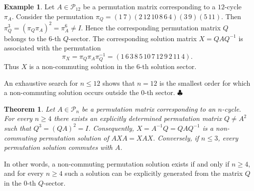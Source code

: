 \documentclass{article}
\newtheorem{theorem}{Theorem}[section]
\theoremstyle{definition}\newtheorem{example}{Example}[section]
\def\P{{\mathcal{P}}}
\begin{document}
	\begin{example}
		Let $A\in \P_{12}$ be a permutation matrix corresponding to a $12$-cycle $\pi_A$. Consider the permutation $\pi_Q=(1\,7)(2\,12\,10\,8\,6\,4)(3\,9)(5\,11)$. Then $\pi_Q^3=(\pi_Q \pi_A)^2=\pi_A^6\neq I$. Hence the corresponding permutation matrix $Q$ belongs to the $6$-th $Q$-sector. The corresponding solution matrix $X=QAQ^{-1}$ is associated with the permutation 
		$$\pi_X=\pi_Q \pi_A \pi_Q^{-1}=(1\,6\,3\,8\,5\,10\,7\,12\,9\,2\,11\,4).$$
		Thus $X$ is a non-commuting solution in the $6$-th solution sector.
		
		An exhaustive search for $n\leq 12$ shows that $n=12$ is the smallest order for which a non-commuting solution occurs outside the $0$-th sector. \hfill$\clubsuit$
	\end{example}
	
	\begin{theorem}\label{constr_noncom_0}
		Let $A\in\P_n$ be a permutation matrix corresponding to an $n$-cycle. For every $n\geq 4$ there exists an explicitly determined permutation matrix $Q\neq A^2$ such that $Q^3=(QA)^2=I$. Consequently, $X=A^{-1}Q=QAQ^{-1}$ is a non-commuting permutation solution of $AXA=XAX$. Conversely, if $n\leq 3$, every permutation solution commutes with $A$.
	\end{theorem}
	
	In other words, a non-commuting permutation solution exists if and only if $n\geq 4$, and for every $n\geq 4$ such a solution can be explicitly generated from the matrix $Q$ in the $0$-th $Q$-sector.
	
\end{document}

